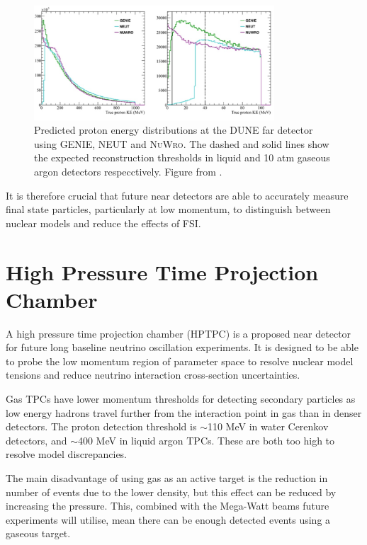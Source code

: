 \begin{figure}
\centering
\includegraphics*[width=0.8\textwidth,clip]{figs/neutgenienuwro}
\caption{Predicted proton energy distributions at the DUNE far detector using \textsc{GENIE}, \textsc{NEUT} and \textsc{NuWro}. The dashed and solid lines show the expected reconstruction thresholds in liquid and 10 atm gaseous argon detectors respecctively. Figure from \cite{dunehptpc}.}\label{fig:generators}
\end{figure}

It is therefore crucial that future near detectors are able to accurately measure final state particles, particularly at low momentum, to distinguish between nuclear models and reduce the effects of FSI.

\section{High Pressure Time Projection Chamber}

A high pressure time projection chamber (HPTPC) is a proposed near detector for future long baseline neutrino oscillation experiments. It is designed to be able to probe the low momentum region of parameter space to resolve nuclear model tensions and reduce neutrino interaction cross-section uncertainties.

Gas TPCs have lower momentum thresholds for detecting secondary particles as low energy hadrons travel further from the interaction point in gas than in denser detectors. The proton detection threshold is $\sim$110 MeV in water Cerenkov detectors, and $\sim$400 MeV in liquid argon TPCs. These are both too high to resolve model discrepancies. 

The main disadvantage of using gas as an active target is the reduction in number of events due to the lower density, but this effect can be reduced by increasing the pressure. This, combined with the Mega-Watt beams future experiments will utilise, mean there can be enough detected events using a gaseous target.

